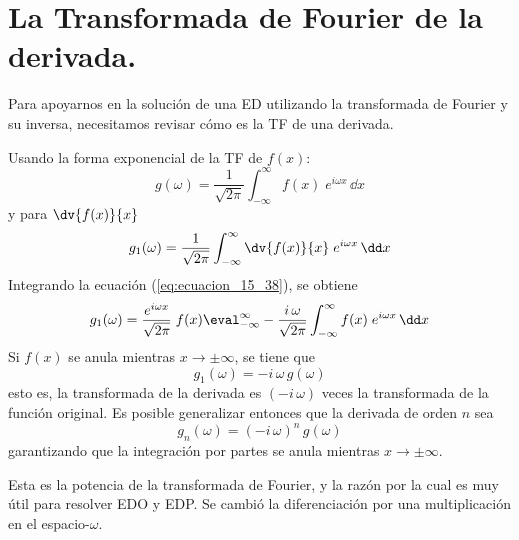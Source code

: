 \section{La Transformada de Fourier de la derivada.}
Para apoyarnos en la solución de una ED utilizando la transformada de Fourier y su inversa, necesitamos revisar cómo es la TF de una derivada. 
\par
Usando la forma exponencial de la TF de $f(x)$:
\begin{equation}
g(\omega) = \dfrac{1}{\sqrt{2 \pi}} \int_{-\infty}^{\infty} f(x) \; e^{i \omega x} \, \dd x
\label{eq:ecuacion_15_37}
\end{equation}
y para $\displaystyle \dv{f(x)}{x}$
\begin{equation}
g_{1}(\omega) = \dfrac{1}{\sqrt{2 \pi}} \int_{-\infty}^{\infty} \dv{f(x)}{x} \; e^{i \omega x} \, \dd x
\label{eq:ecuacion_15_38}
\end{equation}
Integrando la ecuación (\ref{eq:ecuacion_15_38}), se obtiene
\begin{equation}
g_{1}(\omega) = \dfrac{e^{i \omega x}}{\sqrt{2 \pi}} \; f(x) \eval_{-\infty}^{\infty} - \dfrac{i \, \omega}{\sqrt{2 \pi}} \int_{-\infty}^{\infty} f(x) \; e^{i \omega x} \, \dd x
\label{eq:ecuacion_15_39}
\end{equation}
Si $f(x)$ se anula mientras $x \to \pm \infty$, se tiene que
\begin{equation}
g_{1}(\omega) = - i \, \omega \, g(\omega)
\label{eq:ecuacion_15_40}
\end{equation}
esto es, la transformada de la derivada es $(-i \, \omega)$ veces la transformada de la función original. Es posible generalizar entonces que la derivada de orden $n$ sea
\begin{equation}
g_{n} (\omega) = (- i \, \omega)^{n} \, g(\omega)
\label{eq:ecuacion_15_41}
\end{equation}
garantizando que la integración por partes se anula mientras $x \to \pm \infty$.
\par
Esta es la potencia de la transformada de Fourier, y la razón por la cual es muy útil para resolver EDO y EDP. Se cambió la diferenciación por una multiplicación en el espacio-$\omega$.
